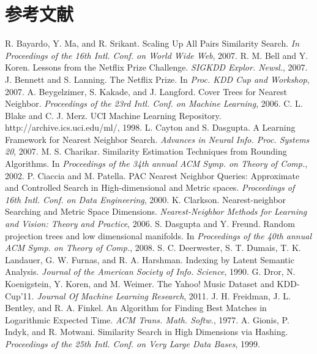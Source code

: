\documentclass[twocolumn,a4paper]{article}
\begin{document}
\section{参考文献}
\renewcommand{\section}[2]{}
\begin{thebibliography}{1}
 R. Bayardo, Y. Ma, and R. Srikant. Scaling Up All Pairs Similarity Search. \emph{In Proceedings of the 16th Intl. Conf. on World Wide Web}, 2007.
 R. M. Bell and Y. Koren. Lessons from the Netflix Prize Challenge. \emph{SIGKDD Explor. Newsl.}, 2007.
 J. Bennett and S. Lanning. The Netflix Prize. In \emph{Proc. KDD Cup and Workshop}, 2007.
 A. Beygelzimer, S. Kakade, and J. Langford. Cover Trees for Nearest Neighbor. \emph{Proceedings of the 23rd Intl. Conf. on Machine Learning}, 2006.
 C. L. Blake and C. J. Merz. UCI Machine Learning Repository. http://archive.ics.uci.edu/ml/, 1998.
 L. Cayton and S. Dasgupta. A Learning Framework for Nearest Neighbor Search. \emph{Advances in Neural Info. Proc. Systems 20}, 2007.
 M. S. Charikar. Similarity Estimation Techniques from Rounding Algorithms. In \emph{Proceedings of the 34th
annual ACM Symp. on Theory of Comp.}, 2002.
 P. Ciaccia and M. Patella. PAC Nearest Neighbor Queries: Approximate and Controlled Search in High-dimensional and Metric spaces. \emph{Proceedings of 16th Intl. Conf. on Data Engineering}, 2000.
 K. Clarkson. Nearest-neighbor Searching and Metric Space Dimensions. \emph{Nearest-Neighbor Methods for
Learning and Vision: Theory and Practice}, 2006.
 S. Dasgupta and Y. Freund. Random projection trees and low dimensional manifolds. In \emph{Proceedings of the
40th annual ACM Symp. on Theory of Comp.}, 2008.
 S. C. Deerwester, S. T. Dumais, T. K. Landauer, G. W. Furnas, and R. A. Harshman. Indexing by Latent Semantic Analysis. \emph{Journal of the American Society of Info. Science}, 1990.
 G. Dror, N. Koenigstein, Y. Koren, and M. Weimer. The Yahoo! Music Dataset and KDD-Cup’11. \emph{Journal Of Machine Learning Research}, 2011.
 J. H. Freidman, J. L. Bentley, and R. A. Finkel. An Algorithm for Finding Best Matches in Logarithmic Expected Time. \emph{ACM Trans. Math. Softw.}, 1977.
 A. Gionis, P. Indyk, and R. Motwani. Similarity Search in High Dimensions via Hashing. \emph{Proceedings of the 25th Intl. Conf. on Very Large Data Bases}, 1999.

\end{thebibliography}
\end{document}
